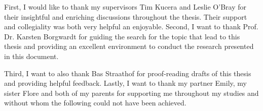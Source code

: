First, I would like to thank my supervisors Tim Kucera and Leslie O'Bray for
their insightful and enriching discussions throughout the thesis. Their support
and collegiality was both very helpful an enjoyable. Second, I want to thank
Prof. Dr. Karsten Borgwardt for guiding the search for the topic that lead to
this thesis and providing an excellent environment to conduct the research
presented in this document.

Third, I want to also thank Bas Straathof for proof-reading drafts of this
thesis and providing helpful feedback. Lastly, I want to thank my partner Emily,
my sister Flore and both of my parents for supporting me throughout my studies and
without whom the following could not have been achieved.
